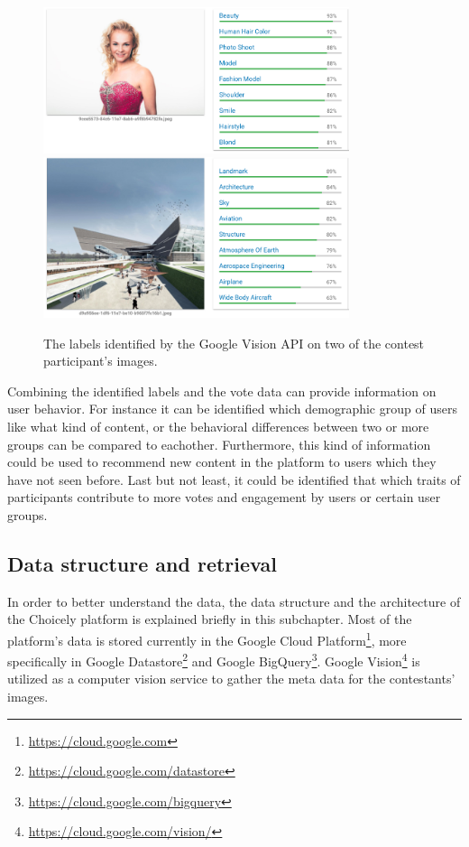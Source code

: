     \begin{figure}[h] 
		\begin{center}
            \includegraphics[width=0.8\textwidth]{images/google_vision_labels.png}
            \includegraphics[width=0.8\textwidth]{images/google_vision_labels2.png}
			\caption{The labels identified by the Google Vision API on two of the contest participant's images.}
			\label{google_vision_labels}
		\end{center}
    \end{figure}

    Combining the identified labels and the vote data can provide information on user behavior. For instance it can be identified which demographic group of users like what kind of content, or the behavioral differences between two or more groups can be compared to eachother. Furthermore, this kind of information could be used to recommend new content in the platform to users which they have not seen before. Last but not least, it could be identified that which traits of participants contribute to more votes and engagement by users or certain user groups.  
    
    \subsection{Data structure and retrieval}
    In order to better understand the data, the data structure and the architecture of the Choicely platform is explained briefly in this subchapter. Most of the platform's data is stored currently in the Google Cloud Platform\footnote{\url{https://cloud.google.com}}, more specifically in Google Datastore\footnote{\url{https://cloud.google.com/datastore}} and Google BigQuery\footnote{\url{https://cloud.google.com/bigquery}}. Google Vision\footnote{\url{https://cloud.google.com/vision/}} is utilized as a computer vision service to gather the meta data for the contestants' images. 
    
